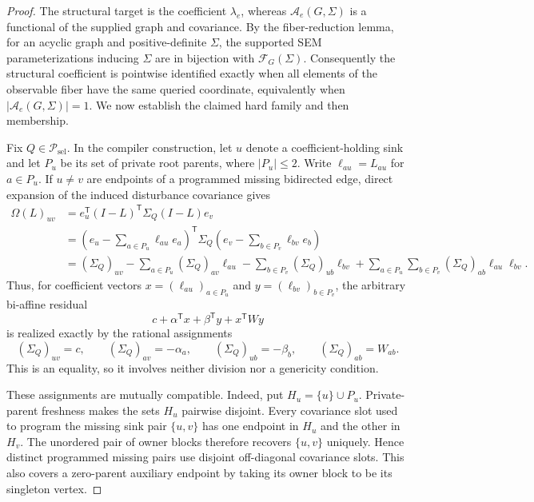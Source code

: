 \documentclass{article}
\begin{document}
\begin{proof}
The structural target is the coefficient \(\lambda_e\), whereas \(\mathcal A_e(G,\Sigma)\) is a functional of the supplied graph and covariance.  By the fiber-reduction lemma, for an acyclic graph and positive-definite \(\Sigma\), the supported SEM parameterizations inducing \(\Sigma\) are in bijection with \(\mathcal F_G(\Sigma)\).  Consequently the structural coefficient is pointwise identified exactly when all elements of the observable fiber have the same queried coordinate, equivalently when \(\lvert\mathcal A_e(G,\Sigma)\rvert=1\).  We now establish the claimed hard family and then membership.

Fix \(Q\in\mathcal P_{\mathrm{sel}}\).  In the compiler construction, let \(u\) denote a coefficient-holding sink and let \(P_u\) be its set of private root parents, where \(\lvert P_u\rvert\leq 2\).  Write \(\ell_{a u}=L_{a u}\) for \(a\in P_u\).  If \(u\neq v\) are endpoints of a programmed missing bidirected edge, direct expansion of the induced disturbance covariance gives
\[
\begin{aligned}
\Omega(L)_{uv}
&=e_u^{\mathsf T}(I-L)^{\mathsf T}\Sigma_Q(I-L)e_v\\
&=\left(e_u-\sum_{a\in P_u}\ell_{a u}e_a\right)^{\mathsf T}
  \Sigma_Q
  \left(e_v-\sum_{b\in P_v}\ell_{b v}e_b\right)\\
&=(\Sigma_Q)_{uv}
-\sum_{a\in P_u}(\Sigma_Q)_{av}\ell_{a u}
-\sum_{b\in P_v}(\Sigma_Q)_{ub}\ell_{b v}
+\sum_{a\in P_u}\sum_{b\in P_v}(\Sigma_Q)_{ab}\ell_{a u}\ell_{b v}.
\end{aligned}
\]
Thus, for coefficient vectors \(x=(\ell_{a u})_{a\in P_u}\) and \(y=(\ell_{b v})_{b\in P_v}\), the arbitrary bi-affine residual
\[
c+\alpha^{\mathsf T}x+\beta^{\mathsf T}y+x^{\mathsf T}Wy
\]
is realized exactly by the rational assignments
\[
(\Sigma_Q)_{uv}=c,\qquad
(\Sigma_Q)_{av}=-\alpha_a,\qquad
(\Sigma_Q)_{ub}=-\beta_b,\qquad
(\Sigma_Q)_{ab}=W_{ab}.
\]
This is an equality, so it involves neither division nor a genericity condition.

These assignments are mutually compatible.  Indeed, put \(H_u=\{u\}\cup P_u\).  Private-parent freshness makes the sets \(H_u\) pairwise disjoint.  Every covariance slot used to program the missing sink pair \(\{u,v\}\) has one endpoint in \(H_u\) and the other in \(H_v\).  The unordered pair of owner blocks therefore recovers \(\{u,v\}\) uniquely.  Hence distinct programmed missing pairs use disjoint off-diagonal covariance slots.  This also covers a zero-parent auxiliary endpoint by taking its owner block to be its singleton vertex.


\end{proof}
\end{document}
